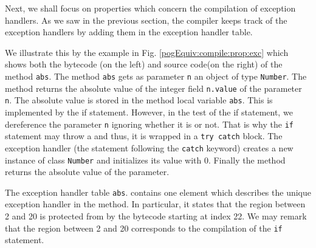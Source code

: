 Next, we shall focus on properties which concern the compilation of exception handlers. 
As we saw in the previous section, the compiler keeps track of the exception 
handlers by adding them in the exception handler table. 

We illustrate this by the example in Fig. \ref{pogEquiv:compile:prop:exc} which shows both the bytecode (on the left) and source code(on the right)
 of the method \lstinline!abs!.
The method \lstinline!abs! gets as parameter \lstinline!n! an object of type  \lstinline!Number!.
 The method returns  the absolute value of the integer field \lstinline!n.value! of the parameter \lstinline!n!. The absolute value is stored
in the method local variable \lstinline!abs!. This is implemented by the if statement. However, in the test of the if statement, we dereference
 the parameter  \lstinline!n! ignoring whether it is \Mynull{} or not. That is why the \lstinline!if! statement may throw a \NullPointerExc{} and thus,
 it is wrapped in a \lstinline!try catch! block. 
The exception handler (the statement following the \lstinline!catch! keyword)
 creates a new instance of class \lstinline!Number! and initializes its value with 0. 
Finally the method returns the absolute value of the parameter.

 The exception handler table  \lstinline!abs!.\ExcHandler{}  contains one element which describes the unique exception handler
in the method. In particular, it states that the region between 2 and 20 is protected from \NullPointerExc{} by the bytecode starting at index 22.
 We may remark that the region between 2 and 20 corresponds to the compilation of the \lstinline!if! statement. 

